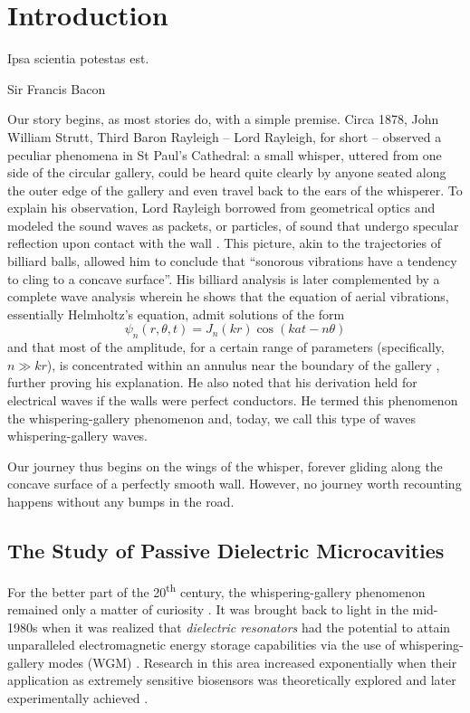 \chapter{Introduction}
\epigraph{Ipsa scientia potestas est.}{Sir Francis Bacon}

Our story begins, as most stories do, with a simple premise. 
Circa 1878, John William Strutt, Third Baron Rayleigh -- Lord Rayleigh, for short -- 
observed a peculiar phenomena in 
St Paul's Cathedral: a small whisper, uttered from one side of the circular
gallery, could be heard quite clearly by anyone seated along the outer edge of the gallery
and even travel back to the ears of the whisperer.
To explain his observation, Lord Rayleigh borrowed from geometrical optics
and modeled the sound waves as packets, or particles, of sound that undergo
specular reflection upon contact with the wall \cite[\S287]{RAY1878}. 
This picture, akin to the trajectories of billiard balls, allowed him to 
conclude that ``sonorous vibrations have a tendency to cling to a concave surface''.
His billiard analysis is later complemented by a complete wave analysis wherein 
he shows that the equation of aerial vibrations, essentially Helmholtz's equation, 
admit solutions of the form
  \begin{equation*}
   \psi_n(r,\theta,t)=J_n(kr)\cos(kat-n\theta)
  \end{equation*}
and that most of the amplitude, for a certain range of parameters (specifically, $n\gg kr$), 
is concentrated within an annulus near the boundary of the gallery \cite{RAY1910}, 
further proving his explanation.
He also noted that his derivation held for electrical waves if the walls
were perfect conductors. He termed this phenomenon the whispering-gallery 
phenomenon and, today, we call this type of waves whispering-gallery waves.

Our journey thus begins on the wings of the whisper, forever gliding
along the concave surface of a perfectly smooth wall. However, no 
journey worth recounting happens without any bumps in the road.

\section{The Study of Passive Dielectric Microcavities}

For the better part of the 20\textsuperscript{th} century, the whispering-gallery 
phenomenon remained only a matter of curiosity \cite{WRI2012}. It was brought
back to light in the mid-1980s when it was realized that \textit{dielectric resonators}
had the potential to attain unparalleled electromagnetic energy storage
capabilities via the use of whispering-gallery modes (WGM) \cite{YAM1993}.
Research in this area increased exponentially when their application as 
extremely sensitive biosensors was theoretically explored 
and later experimentally achieved \cite{SER95,VOL2002,ARM2003,VOL2008,COR2011}.

